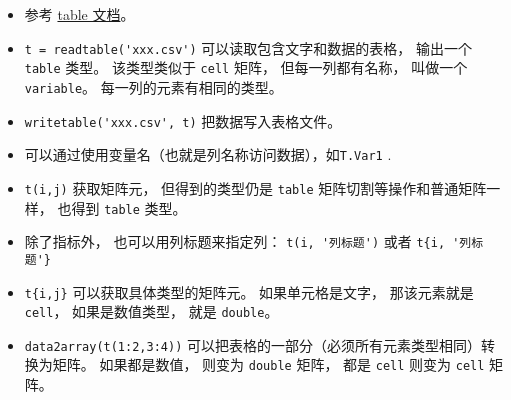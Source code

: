 
\begin{issues}
\issueDraft
\end{issues}

\begin{itemize}
\item 参考 \href{https://www.mathworks.com/help/matlab/tables.html}{table 文档}。
\item \verb|t = readtable('xxx.csv')| 可以读取包含文字和数据的表格， 输出一个 \verb|table| 类型。 该类型类似于 \verb|cell| 矩阵， 但每一列都有名称， 叫做一个 \verb|variable|。 每一列的元素有相同的类型。
\item \verb|writetable('xxx.csv', t)| 把数据写入表格文件。

\item 可以通过使用变量名（也就是列名称访问数据），如\verb|T.Var1| .
\item \verb|t(i,j)| 获取矩阵元， 但得到的类型仍是 \verb|table| 矩阵切割等操作和普通矩阵一样， 也得到 \verb|table| 类型。
\item 除了指标外， 也可以用列标题来指定列： \verb|t(i, '列标题')| 或者 \verb|t{i, '列标题'}|
\item \verb|t{i,j}| 可以获取具体类型的矩阵元。 如果单元格是文字， 那该元素就是 \verb|cell|， 如果是数值类型， 就是 \verb|double|。
\item \verb|data2array(t(1:2,3:4))|  可以把表格的一部分（必须所有元素类型相同）转换为矩阵。 如果都是数值， 则变为 \verb|double| 矩阵， 都是 \verb|cell| 则变为 \verb|cell| 矩阵。
\end{itemize}
